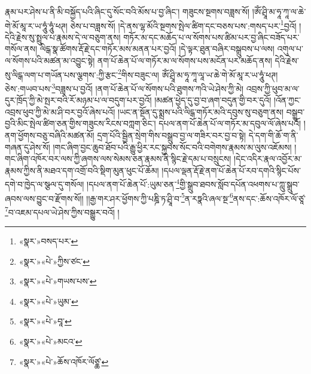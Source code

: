 རྣམ་པར་ཤེས་པ་ནི་མི་བསྐྱོད་པའི་ཞིང་དུ་སོང་བའི་མོས་པ་བྱ་ཞིང་། གཟུངས་སྔགས་བཟླས་སོ། །ཨོཾ་ཤྲཱི་མ་ཧཱ་ཀཱ་ལ་ཆེ་གེ་མོ་མཱ་ར་ཡ་ཧཱུཾ་ཧཱུཾ་ཕཊ། ཅེས་པ་བཟླས་སོ། །དེ་ནས་ལྷ་མོའི་སྔགས་སྤེལ་ཚིག་དང་བཅས་པས་:གསད་པར་\footnote{«སྣར་»བསད་པར་}བྱའོ། །དེའི་རྗེས་སུ་སྤྲུལ་པ་རྣམས་དེ་ལ་བཅུག་ནས། གཏོར་མ་དང་མཆོད་པ་ལ་སོགས་པས་ཚིམ་པར་བྱ་ཞིང་བཟོད་པར་གསོལ་ནས། ལིངྒ་སྣ་ཚོགས་རྡོ་རྗེ་དང་གཏོར་མས་མནན་པར་བྱའོ། །དེ་ལྟར་ཐུན་བཞིར་བསྒྲུབས་པ་ལས། འགུལ་པ་ལ་སོགས་པའི་མཚན་མ་འབྱུང་སྟེ། ནག་པོ་ཆེན་པོ་ལ་གཏོར་མ་ལ་སོགས་པས་མངོན་པར་མཆོད་ནས། དེའི་རྗེས་སུ་ལིངྒ་ལག་པ་གཡོན་པས་ལྕགས་:ཀྱི་རྩང་\footnote{«སྣར་»«པེ་»ཀྱིས་ཙང་}གིས་བཟུང་ལ། ཨོཾ་ཤྲཱི་མ་ཧཱ་ཀཱ་ལཱ་ཡ་ཆེ་གེ་མོ་མཱ་ར་ཡ་ཧཱུཾ་ཕཊ། ཅེས་:གཡབ་པས་\footnote{«སྣར་»«པེ་»གཡས་པས་}བཟླས་པ་བྱའོ། །ནག་པོ་ཆེན་པོ་ལ་སོགས་པའི་ཐུགས་ཀའི་ཡེ་ཤེས་ཀྱི་མེ། འབྲས་ཀྱི་ཕུབ་མ་ལ་དུར་ཁྲོད་ཀྱི་མེ་སྤར་བའི་རོ་མཉམ་པ་ལ་བདུག་པར་བྱའོ། །མཚན་ཕྱེད་དུ་བྱ་བ་ཞག་བདུན་གྱི་བར་དུའོ། །འོན་ཀྱང་འབྲས་ཕུབ་ཀྱི་མེ་མ་ཤི་བར་བྱའོ་ཞེས་པའོ། །ཡང་ན་སྔོན་དུ་སྨྲས་པའི་ལིངྒ་གཏོར་མའི་དབུས་སུ་བཅུག་ནས། བསྒྲུབ་བྱའི་མིང་སྤེལ་ཚིག་ཅན་གྱིས་གཟུངས་རིངས་བཀླག་ཅིང་། དཔལ་ནག་པོ་ཆེན་པོ་ལ་གཏོར་མ་དབུལ་ལོ་ཞེས་པའོ། །ནག་ཕྱོགས་བཅུ་བཞིའི་མཚན་མོ། དྲག་པོའི་སྦྱིན་སྲེག་གིས་བསྒྲུབ་བྱ་ལ་གཟིར་བར་བྱ་བ་སྟེ། དེ་དག་གི་ཆོ་ག་ནི་གཞན་དུ་ཤེས་སོ། །གང་ཞིག་བྱང་ཆུབ་ཐོབ་པའི་རྒྱུ་ཕྱིར་རང་སྐྱབས་སོང་བའི་བགེགས་རྣམས་མ་ལུས་འཇོམས། །གང་ཞིག་འཁོར་བར་ལས་ཀྱི་ཞགས་ལས་སེམས་ཅན་རྣམས་ནི་སྙིང་རྗེ་དམ་པ་བསྲུངས། །དེང་འདིར་རྣལ་འབྱོར་མ་རྣམས་ཀྱིས་ནི་མཐའ་དག་འགྲོ་བའི་སྡིག་མུན་ཕུང་པོ་ཆོམ། །དཔལ་ལྡན་རྡོ་རྗེ་ནག་པོ་ཆེན་པོ་རབ་དགའི་སྙིང་པོས་དགེ་བ་ཁྱེད་ལ་སྩལ་དུ་གསོལ། །དཔལ་ནག་པོ་ཆེན་པོ་:ཡུམ་ཅན་\footnote{«སྣར་»«པེ་»ཡུམ་}གྱི་སྒྲུབ་ཐབས་སློབ་དཔོན་འཕགས་པ་ཀླུ་སྒྲུབ་ཞབས་ལས་བྱུང་བ་རྫོགས་སོ།། །།རྒྱ་གར་ཤར་ཕྱོགས་ཀྱི་པཎྜི་ཏ་ཤྲཱི་བ་\footnote{«སྣར་»«པེ་»བཱ་}ན་རཏྣའི་ཞལ་སྔ་\footnote{«སྣར་»«པེ་»མངའ་}ནས་དང་:ཆོས་འཁོར་ལོ་ཙཱ་\footnote{«སྣར་»«པེ་»ཆོས་འཁོར་ལོཙྖ་}བ་འཇམ་དཔལ་ཡེ་ཤེས་ཀྱིས་བསྒྱུར་བའོ། ། 